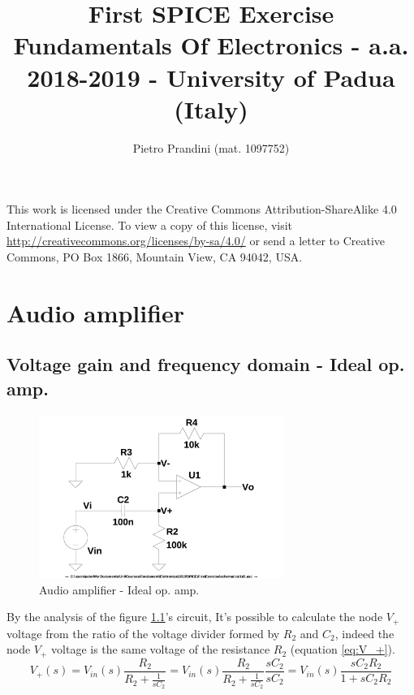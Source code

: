 \documentclass[10pt,a4paper]{book}
\title{First SPICE Exercise\\{\small{Fundamentals Of Electronics - a.a. 2018-2019 -
University of Padua (Italy)}}}
\author{Pietro Prandini (mat. 1097752)}
\begin{document}
\maketitle

\vspace*{\fill}
\begin{center}
\tiny{This work is licensed under the Creative Commons Attribution-ShareAlike 4.0 International License. To view a copy of this license, visit \href{http://creativecommons.org/licenses/by-sa/4.0/}{http://creativecommons.org/licenses/by-sa/4.0/} or send a letter to Creative Commons, PO Box 1866, Mountain View, CA 94042, USA.}
\end{center}

\tableofcontents

\chapter{Audio amplifier}
\section{Voltage gain and frequency domain - Ideal op. amp.}
\begin{figure}[H]
  \centering
  \includegraphics[width=8cm]{schematics/1d1.jpg}
  \caption{Audio amplifier - Ideal op. amp.}
  \label{1d1schematics}
\end{figure}

By the analysis of the figure \ref{1d1schematics}'s circuit, It's possible to calculate the node $V_+$ voltage from the ratio of the voltage divider formed by $R_2$ and $C_2$, indeed the node $V_+$ voltage is the same voltage of the resistance $R_2$ (equation \ref{eq:V_+}).\\
\begin{equation} \label{eq:V_+}
  V_+(s) = V_{in}(s)\frac{R_2}{R_2+\frac{1}{sC_2}} =
  V_{in}(s)\frac{R_2}{R_2+\frac{1}{sC_2}}\frac{sC_2}{sC_2} =
  V_{in}(s)\frac{sC_2R_2}{1+sC_2R_2}
\end{equation}
\end{document}
